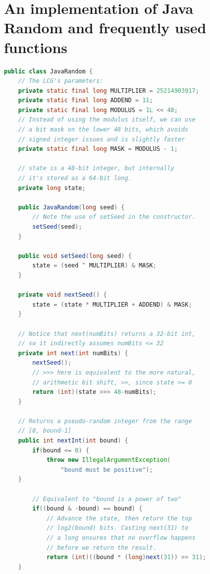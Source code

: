 \documentclass{article}
\begin{document}

\appendix

\section{An implementation of Java Random and frequently used functions}\label{appendix.jrand}

\begin{lstlisting}[language=Java]
public class JavaRandom {
    // The LCG's parameters:
    private static final long MULTIPLIER = 25214903917;
    private static final long ADDEND = 11;
    private static final long MODULUS = 1L << 48;
    // Instead of using the modulus itself, we can use
    // a bit mask on the lower 48 bits, which avoids
    // signed integer issues and is slightly faster
    private static final long MASK = MODULUS - 1;

    // state is a 48-bit integer, but internally
    // it's stored as a 64-bit long.
    private long state;

    public JavaRandom(long seed) {
        // Note the use of setSeed in the constructor.
        setSeed(seed);
    }

    public void setSeed(long seed) {
        state = (seed ^ MULTIPLIER) & MASK;
    }

    private void nextSeed() {
        state = (state * MULTIPLIER + ADDEND) & MASK;
    }

    // Notice that next(numBits) returns a 32-bit int, 
    // so it indirectly assumes numBits <= 32
    private int next(int numBits) {
        nextSeed();
        // >>> here is equivalent to the more natural,
        // arithmetic bit shift, >>, since state >= 0
        return (int)(state >>> 48-numBits);
    }

    // Returns a pseudo-random integer from the range
    // [0, bound-1]
    public int nextInt(int bound) {
        if(bound <= 0) {
            throw new IllegalArgumentException(
                "bound must be positive");
	}

        // Equivalent to "bound is a power of two"
        if((bound & -bound) == bound) {
            // Advance the state, then return the top 
            // log2(bound) bits. Casting next(31) to 
            // a long ensures that no overflow happens 
            // before we return the result.
            return (int)((bound * (long)next(31)) >> 31);
	}
 

\end{lstlisting}
\end{document}

